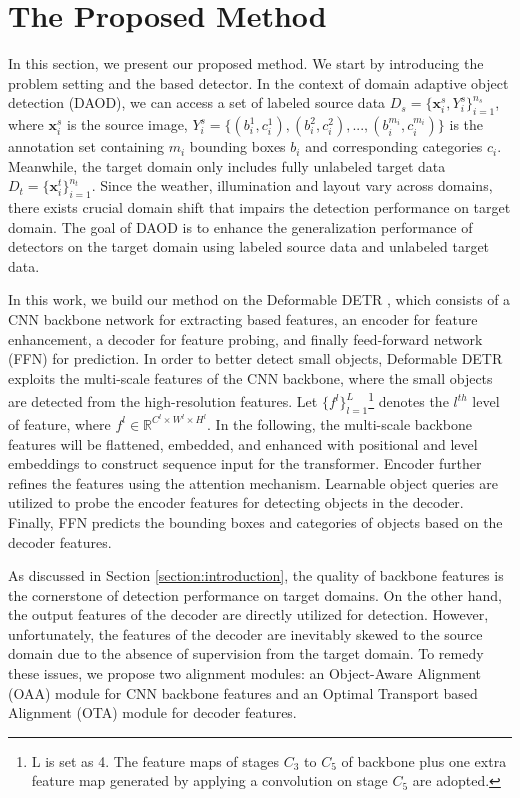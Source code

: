 \documentclass[sigconf]{acmart}
\begin{document}
 \section{The Proposed Method}
In this section, we present our proposed method. We start by introducing the problem setting and the based detector. In the context of domain adaptive object detection (DAOD), we can access a set of labeled source data $D_s=\{ \boldsymbol{x}_{i}^s, Y_i^s \}_{i=1}^{n_s}$, where $\boldsymbol{x}_i^s$ is the source image, $ Y_i^s = \{(b_i^1, c_i^1), (b_i^2, c_i^2), ..., (b_i^{m_i}, c_i^{m_i})\}$ is the annotation set containing $m_i$ bounding boxes $b_i$ and corresponding categories $c_i$. Meanwhile, the target domain only includes fully unlabeled target data $D_t=\{\boldsymbol{x}_i^t\}_{i=1}^{n_t}$. Since the weather, illumination and layout vary across domains, there exists crucial domain shift that impairs the detection performance on target domain. The goal of DAOD is to enhance the generalization performance of detectors on the target domain using labeled source data and unlabeled target data.

In this work, we build our method on the Deformable DETR \cite{zhu2020deformable}, which consists of a CNN backbone network for extracting based features, an encoder for feature enhancement, a decoder for feature probing, and finally feed-forward network (FFN) for prediction. In order to better detect small objects, Deformable DETR exploits the multi-scale features of the CNN backbone, where the small objects are detected from the high-resolution features. Let $\{f^l\}_{l=1}^{L}$\footnote{L is set as 4. The feature maps of stages $C_3$ to $C_5$ of backbone plus one extra feature map generated by applying a convolution on stage $C_5$ are adopted.} denotes the $l^{th}$ level of feature, where $f^l \in \mathbb{R}^{C^l \times W^l \times H^l} $. In the following, the multi-scale backbone features will be flattened, embedded, and enhanced with positional and level embeddings \cite{zhu2020deformable} to construct sequence input for the transformer. Encoder further refines the features using the attention mechanism. Learnable object queries are utilized to probe the encoder features for detecting objects in the decoder. Finally, FFN predicts the bounding boxes and categories of objects based on the decoder features.

As discussed in Section \ref{section:introduction}, the quality of backbone features is the cornerstone of detection performance on target domains. On the other hand, the output features of the decoder are directly utilized for detection. However, unfortunately, the features of the decoder are inevitably skewed to the source domain due to the absence of supervision from the target domain. To remedy these issues, we propose two alignment modules: an Object-Aware Alignment (OAA) module for CNN backbone features and an Optimal Transport based Alignment (OTA) module for decoder features.
\end{document}
